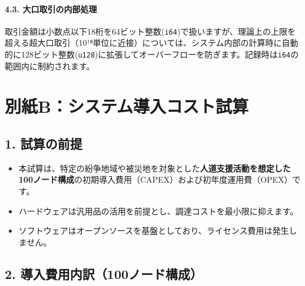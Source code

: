 \documentclass[
  a4paper,
  ja=standard,
  xelatex]{bxjsarticle}
\begin{document}
\paragraph{\texorpdfstring{\textbf{4.3.
大口取引の内部処理}}{4.3. 大口取引の内部処理}}\label{ux5927ux53e3ux53d6ux5f15ux306eux5185ux90e8ux51e6ux7406}

取引金額は小数点以下18桁を64ビット整数(\texttt{i64})で扱いますが、理論上の上限を超える超大口取引（10¹⁸単位に近接）については、システム内部の計算時に自動的に128ビット整数(\texttt{u128})に拡張してオーバーフローを防ぎます。記録時は\texttt{i64}の範囲内に制約されます。

\section{\texorpdfstring{\textbf{別紙B：システム導入コスト試算}}{別紙B：システム導入コスト試算}}\label{ux5225ux7d19bux30b7ux30b9ux30c6ux30e0ux5c0eux5165ux30b3ux30b9ux30c8ux8a66ux7b97}

\subsection{\texorpdfstring{\textbf{1.
試算の前提}}{1. 試算の前提}}\label{ux8a66ux7b97ux306eux524dux63d0}

\begin{itemize}
\item
  本試算は、特定の紛争地域や被災地を対象とした\textbf{人道支援活動を想定した100ノード構成}の初期導入費用（CAPEX）および初年度運用費（OPEX）です。
\item
  ハードウェアは汎用品の活用を前提とし、調達コストを最小限に抑えます。
\item
  ソフトウェアはオープンソースを基盤としており、ライセンス費用は発生しません。
\end{itemize}

\subsection{\texorpdfstring{\textbf{2.
導入費用内訳（100ノード構成）}}{2. 導入費用内訳（100ノード構成）}}\label{ux5c0eux5165ux8cbbux7528ux5185ux8a33100ux30ceux30fcux30c9ux69cbux6210}
\end{document}
